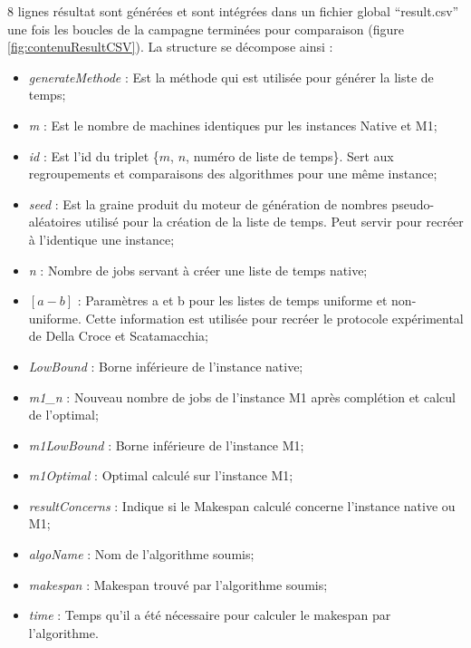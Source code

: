 \documentclass[a4paper,12pt]{report}
\theoremstyle{plain}				%
\theoremstyle{definition}				%
\newcommand\dcs{Della Croce et Scatamacchia\xspace}
\begin{document}
8 lignes résultat sont générées et sont intégrées dans un fichier global ``result.csv'' une fois les boucles de la campagne terminées pour comparaison (figure \ref{fig:contenuResultCSV}). La structure se décompose ainsi :
\begin{itemize}
	\item \textit{generateMethode} : Est la méthode qui est utilisée pour générer la liste de temps;
	 
	\item \textit{m} : Est le nombre de machines identiques pur les instances Native et M1;
	 
	\item \textit{id} : Est l'id du triplet \{$m$, $n$, numéro de liste de temps\}. 
	Sert aux regroupements et comparaisons des algorithmes pour une même instance;
	
	\item \textit{seed} : Est la graine produit du moteur de génération de nombres pseudo-aléatoires 
	utilisé pour la création de la liste de temps. 
	Peut servir pour recréer à l'identique une instance;
	 
	\item \textit{n} : Nombre de jobs servant à créer une liste de temps native;
	 
	\item \textit{$[a-b]$} : Paramètres a et b pour les listes de temps uniforme et non-uniforme. 
	Cette information est utilisée pour recréer le protocole expérimental de \dcs;
	
	\item \textit{LowBound} : Borne inférieure de l'instance native;
	
	\item \textit{m1\_n} : Nouveau nombre de jobs de l'instance M1 après complétion et calcul de l'optimal;
	
	\item \textit{m1LowBound} : Borne inférieure de l'instance M1;
	
	\item \textit{m1Optimal} : Optimal calculé sur l'instance M1;
	
	\item \textit{resultConcerns} : Indique si le Makespan calculé concerne l'instance native ou M1;
	
	\item \textit{algoName} : Nom de l'algorithme soumis;
	
	\item \textit{makespan} : Makespan trouvé par l'algorithme soumis;
	
	\item \textit{time} : Temps qu'il a été nécessaire pour calculer le makespan	par l’algorithme. 
\end{itemize}
\end{document}
